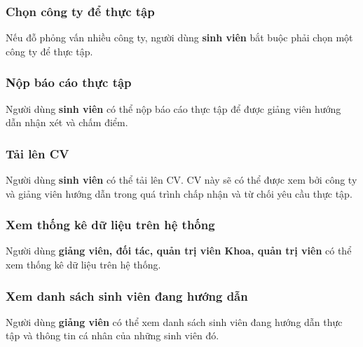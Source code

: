 \documentclass[./../main.tex]{subfiles}
\begin{document}
  \hypertarget{chux1ecdn-cuxf4ng-ty-ux111ux1ec3-thux1ef1c-tux1eadp}{%
  \subsubsection{Chọn công ty để thực
  tập}\label{chux1ecdn-cuxf4ng-ty-ux111ux1ec3-thux1ef1c-tux1eadp}}
  
  Nếu đỗ phỏng vấn nhiều công ty, người dùng \textbf{sinh viên} bắt buộc
  phải chọn một công ty để thực tập.
  
  \hypertarget{nux1ed9p-buxe1o-cuxe1o-thux1ef1c-tux1eadp}{%
  \subsubsection{Nộp báo cáo thực
  tập}\label{nux1ed9p-buxe1o-cuxe1o-thux1ef1c-tux1eadp}}
  
  Người dùng \textbf{sinh viên} có thể nộp báo cáo thực tập để được giảng
  viên hướng dẫn nhận xét và chấm điểm.
  
  \hypertarget{tux1ea3i-luxean-cv}{%
  \subsubsection{Tải lên CV}\label{tux1ea3i-luxean-cv}}
  
  Người dùng \textbf{sinh viên} có thể tải lên CV. CV này sẽ có thể được
  xem bởi công ty và giảng viên hướng dẫn trong quá trình chấp nhận và từ
  chối yêu cầu thực tập.
  
  \hypertarget{xem-thux1ed1ng-kuxea-dux1eef-liux1ec7u-truxean-hux1ec7-thux1ed1ng}{%
  \subsubsection{Xem thống kê dữ liệu trên hệ
  thống}\label{xem-thux1ed1ng-kuxea-dux1eef-liux1ec7u-truxean-hux1ec7-thux1ed1ng}}
  
  Người dùng \textbf{giảng viên, đối tác, quản trị viên Khoa, quản trị
  viên} có thể xem thống kê dữ liệu trên hệ thống.
  
  \hypertarget{xem-danh-suxe1ch-sinh-viuxean-ux111ang-hux1b0ux1edbng-dux1eabn}{%
  \subsubsection{Xem danh sách sinh viên đang hướng
  dẫn}\label{xem-danh-suxe1ch-sinh-viuxean-ux111ang-hux1b0ux1edbng-dux1eabn}}
  
  Người dùng \textbf{giảng viên} có thể xem danh sách sinh viên đang hướng
  dẫn thực tập và thông tin cá nhân của những sinh viên đó.
  
\end{document}
